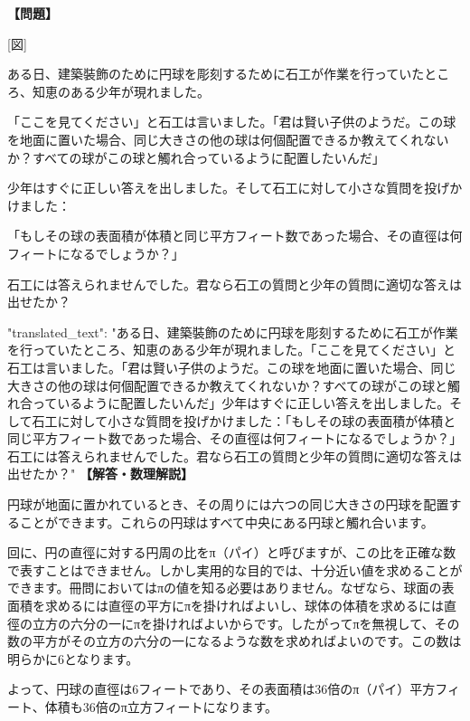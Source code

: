 \documentclass[10pt,a4paper,oneside,openany]{ltjsbook}
\begin{document}
\begin{tcolorbox}[colback=softblue,colframe=primaryblue,title=\textbf{第 188 問：THE BALL PROBLEM.},arc=2mm,boxrule=1pt,breakable]
\textbf{【問題】}\par\vspace{0.3em}

[図]

ある日、建築裝飾のために円球を彫刻するために石工が作業を行っていたところ、知恵のある少年が現れました。

「ここを見てください」と石工は言いました。「君は賢い子供のようだ。この球を地面に置いた場合、同じ大きさの他の球は何個配置できるか教えてくれないか？すべての球がこの球と觸れ合っているように配置したいんだ」

少年はすぐに正しい答えを出しました。そして石工に対して小さな質問を投げかけました：

「もしその球の表面積が体積と同じ平方フィート数であった場合、その直徑は何フィートになるでしょうか？」

石工には答えられませんでした。君なら石工の質問と少年の質問に適切な答えは出せたか？

{
  "translated\_text": "ある日、建築裝飾のために円球を彫刻するために石工が作業を行っていたところ、知恵のある少年が現れました。「ここを見てください」と石工は言いました。「君は賢い子供のようだ。この球を地面に置いた場合、同じ大きさの他の球は何個配置できるか教えてくれないか？すべての球がこの球と觸れ合っているように配置したいんだ」少年はすぐに正しい答えを出しました。そして石工に対して小さな質問を投げかけました：「もしその球の表面積が体積と同じ平方フィート数であった場合、その直徑は何フィートになるでしょうか？」石工には答えられませんでした。君なら石工の質問と少年の質問に適切な答えは出せたか？"
}
\tcblower
\textbf{【解答・数理解説】}\par\vspace{0.3em}
円球が地面に置かれているとき、その周りには六つの同じ大きさの円球を配置することができます。これらの円球はすべて中央にある円球と觸れ合います。

回に、円の直徑に対する円周の比をπ（パイ）と呼びますが、この比を正確な数で表すことはできません。しかし実用的な目的では、十分近い値を求めることができます。冊問においてはπの値を知る必要はありません。なぜなら、球面の表面積を求めるには直徑の平方にπを掛ければよいし、球体の体積を求めるには直徑の立方の六分の一にπを掛ければよいからです。したがってπを無視して、その数の平方がその立方の六分の一になるような数を求めればよいのです。この数は明らかに6となります。

よって、円球の直徑は6フィートであり、その表面積は36倍のπ（パイ）平方フィート、体積も36倍のπ立方フィートになります。
\end{tcolorbox}
\end{document}
